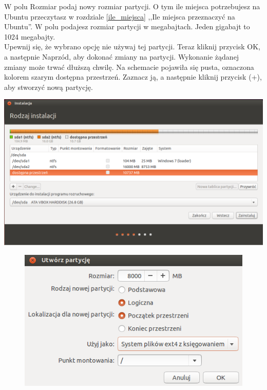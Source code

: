 W polu \textcolor{ubuntu_orange}{Rozmiar} podaj nowy rozmiar partycji. O tym ile miejsca potrzebujesz na Ubuntu przeczytasz w rozdziale \ref{ile_miejsca} ,,Ile miejsca przeznaczyć na Ubuntu''. W polu podajesz rozmiar partycji w megabajtach. Jeden gigabajt to 1024 megabajty.\\
Upewnij się, że wybrano opcję \textcolor{ubuntu_orange}{nie używaj tej partycji}. Teraz kliknij przycisk \textcolor{ubuntu_orange}{OK}, a następnie \textcolor{ubuntu_orange}{Naprzód}, aby dokonać zmiany na partycji. Wykonanie żądanej zmiany może trwać dłuższą chwilę.
Na schemacie pojawiła się pusta, oznaczona kolorem szarym \textcolor{ubuntu_orange}{dostępna przestrzeń}. Zaznacz ją, a następnie kliknij przycisk (\textcolor{ubuntu_orange}{+}), aby stworzyć nową partycję.

\begin{center}
        \includegraphics[width=\linewidth]{images/instalator_partycjonowanie_gparted3.png}
\end{center}

\clearpage
\begin{figure}
                \includegraphics[width=\linewidth]{images/instalator_partycjonowanie_gparted_dodaj_root.png}
\end{figure}

